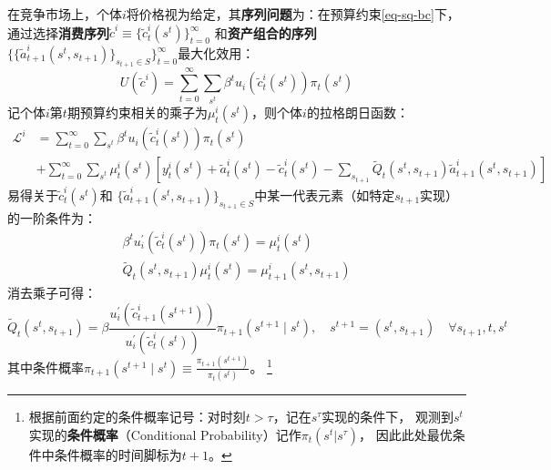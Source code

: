 在竞争市场上，个体$i$将价格视为给定，其\textbf{序列问题}为：在预算约束\ref{eq-sq-bc}下，
通过选择\textbf{消费序列}$\tilde{c}^i \equiv \{\tilde{c}_t^i\left(s^t\right)\}_{t=0}^{\infty}$
和\textbf{资产组合的序列}$\{\{\tilde{a}_{t+1}^i\left(s^t,s_{t+1}\right)\}_{s_{t+1}\in S}\}_{t=0}^{\infty}$最大化效用：
\begin{equation} \label{eq-sq-preference-i}
    U\left(\tilde{c}^i\right)=\sum_{t=0}^{\infty}\sum_{s^t}\beta^t u_i\left(\tilde{c}_t^i\left(s^t\right)\right)\pi_t\left(s^t\right)
\end{equation}  
记个体$i$第$t$期预算约束相关的乘子为$\mu_t^i\left(s^t\right)$，则个体$i$的拉格朗日函数：
\begin{equation*}
    \begin{aligned}
        \mathcal{L}^i & =\sum_{t=0}^{\infty} \sum_{s^t} \beta^t u_i\left(\tilde{c}_t^i\left(s^t\right)\right) \pi_t\left(s^t\right) \\
        &+\sum_{t=0}^{\infty} \sum_{s^t} \mu_t^i\left(s^t\right)
            \left[y_t^i\left(s^t\right)+\tilde{a}_t^i\left(s^t\right)-\tilde{c}_t^i\left(s^t\right)
                -\sum_{s_{t+1}} \tilde{Q}_t\left(s^t, s_{t+1}\right) \tilde{a}_{t+1}^i\left(s^t, s_{t+1}\right)\right]
        \end{aligned}
\end{equation*}
易得关于$\tilde{c}_t^i\left(s^t\right)$和
$\{\tilde{a}_{t+1}^i\left(s^t,s_{t+1}\right)\}_{s_{t+1}\in S}$中某一代表元素（如特定$s_{t+1}$实现）的一阶条件为：
\begin{align}
    \beta^t u_i^{\prime}\left(\tilde{c}_t^i\left(s^t\right)\right) \pi_t\left(s^t\right) = \mu_t^i\left(s^t\right) \\
    \tilde{Q}_t\left(s^t, s_{t+1}\right) \mu_t^i\left(s^t\right) = \mu_{t+1}^i\left(s^t, s_{t+1}\right)
\end{align}
消去乘子可得：
\begin{equation}    \label{eq-sq-foc1}
    \tilde{Q}_t\left(s^t, s_{t+1}\right) = 
        \beta \frac{u_i^{\prime}\left(\tilde{c}_{t+1}^i\left(s^{t+1}\right)\right)}
            {u_i^{\prime}\left(\tilde{c}_t^i\left(s^t\right)\right)} 
                \pi_{t+1}\left(s^{t+1} \mid s^t\right), \quad s^{t+1}=(s^t,s_{t+1}) \quad \forall s_{t+1}, t, s^t
\end{equation}
其中条件概率$\pi_{t+1}\left(s^{t+1} \mid s^t\right)\equiv \frac{\pi_{t+1}\left(s^{t+1}\right)}{\pi_t\left(s^t\right)}$。
\footnote{根据前面约定的条件概率记号：对时刻$t>\tau$，记在$s^{\tau}$实现的条件下，
观测到$s^t$实现的\textbf{条件概率}（Conditional Probability）记作$\pi_t\left(s^t|s^{\tau}\right)$，
因此此处最优条件中条件概率的时间脚标为$t+1$。}


